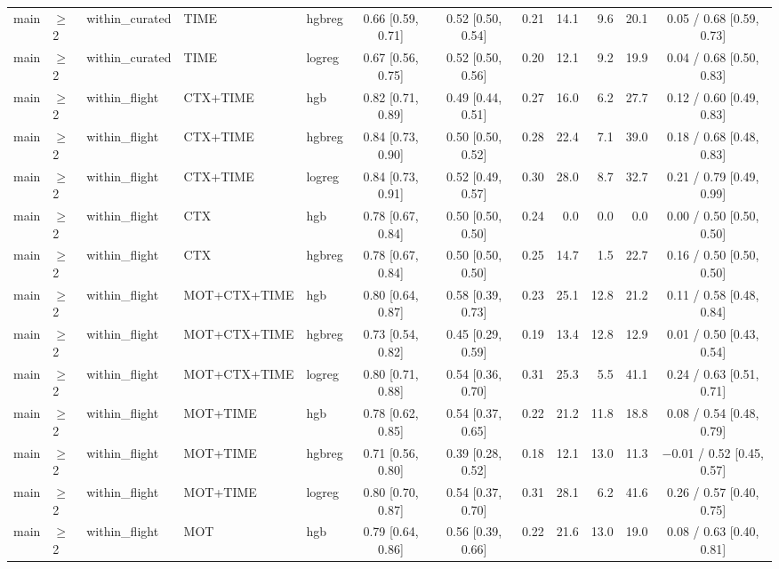 \begin{longtable}{@{}lllllcccrrrc@{}}
main & $\geq$2 & within\_curated & TIME & hgbreg & 0.66 [0.59, 0.71] & 0.52 [0.50, 0.54] & 0.21 & 14.1 & 9.6 & 20.1 & 0.05 / 0.68 [0.59, 0.73] \\
main & $\geq$2 & within\_curated & TIME & logreg & 0.67 [0.56, 0.75] & 0.52 [0.50, 0.56] & 0.20 & 12.1 & 9.2 & 19.9 & 0.04 / 0.68 [0.50, 0.83] \\
main & $\geq$2 & within\_flight & CTX+TIME & hgb & 0.82 [0.71, 0.89] & 0.49 [0.44, 0.51] & 0.27 & 16.0 & 6.2 & 27.7 & 0.12 / 0.60 [0.49, 0.83] \\
main & $\geq$2 & within\_flight & CTX+TIME & hgbreg & 0.84 [0.73, 0.90] & 0.50 [0.50, 0.52] & 0.28 & 22.4 & 7.1 & 39.0 & 0.18 / 0.68 [0.48, 0.83] \\
main & $\geq$2 & within\_flight & CTX+TIME & logreg & 0.84 [0.73, 0.91] & 0.52 [0.49, 0.57] & 0.30 & 28.0 & 8.7 & 32.7 & 0.21 / 0.79 [0.49, 0.99] \\
main & $\geq$2 & within\_flight & CTX & hgb & 0.78 [0.67, 0.84] & 0.50 [0.50, 0.50] & 0.24 & 0.0 & 0.0 & 0.0 & 0.00 / 0.50 [0.50, 0.50] \\
main & $\geq$2 & within\_flight & CTX & hgbreg & 0.78 [0.67, 0.84] & 0.50 [0.50, 0.50] & 0.25 & 14.7 & 1.5 & 22.7 & 0.16 / 0.50 [0.50, 0.50] \\
main & $\geq$2 & within\_flight & MOT+CTX+TIME & hgb & 0.80 [0.64, 0.87] & 0.58 [0.39, 0.73] & 0.23 & 25.1 & 12.8 & 21.2 & 0.11 / 0.58 [0.48, 0.84] \\
main & $\geq$2 & within\_flight & MOT+CTX+TIME & hgbreg & 0.73 [0.54, 0.82] & 0.45 [0.29, 0.59] & 0.19 & 13.4 & 12.8 & 12.9 & 0.01 / 0.50 [0.43, 0.54] \\
main & $\geq$2 & within\_flight & MOT+CTX+TIME & logreg & 0.80 [0.71, 0.88] & 0.54 [0.36, 0.70] & 0.31 & 25.3 & 5.5 & 41.1 & 0.24 / 0.63 [0.51, 0.71] \\
main & $\geq$2 & within\_flight & MOT+TIME & hgb & 0.78 [0.62, 0.85] & 0.54 [0.37, 0.65] & 0.22 & 21.2 & 11.8 & 18.8 & 0.08 / 0.54 [0.48, 0.79] \\
main & $\geq$2 & within\_flight & MOT+TIME & hgbreg & 0.71 [0.56, 0.80] & 0.39 [0.28, 0.52] & 0.18 & 12.1 & 13.0 & 11.3 & $-$0.01 / 0.52 [0.45, 0.57] \\
main & $\geq$2 & within\_flight & MOT+TIME & logreg & 0.80 [0.70, 0.87] & 0.54 [0.37, 0.70] & 0.31 & 28.1 & 6.2 & 41.6 & 0.26 / 0.57 [0.40, 0.75] \\
main & $\geq$2 & within\_flight & MOT & hgb & 0.79 [0.64, 0.86] & 0.56 [0.39, 0.66] & 0.22 & 21.6 & 13.0 & 19.0 & 0.08 / 0.63 [0.40, 0.81] \\

\end{longtable}

